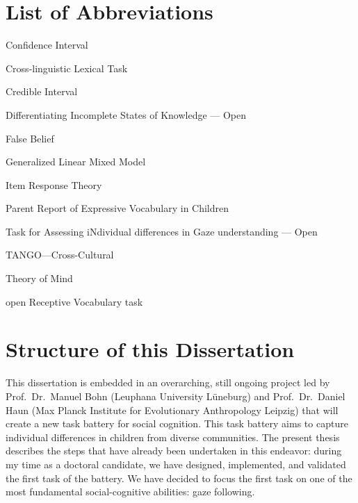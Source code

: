 \documentclass[
]{scrbook}
\providecommand{\tightlist}{%
  \setlength{\itemsep}{0pt}\setlength{\parskip}{0pt}}
\begin{document}
\chapter{List of Abbreviations}\label{acronyms_HEADER_LOA}

\begin{description}
\tightlist
\item[\phantomsection\label{acronyms_CI}{CI}]
Confidence Interval
\item[\phantomsection\label{acronyms_CLT}{CLT}]
Cross-linguistic Lexical Task
\item[\phantomsection\label{acronyms_CrI}{CrI}]
Credible Interval
\item[\phantomsection\label{acronyms_DISKO}{DISKO}]
Differentiating Incomplete States of Knowledge --- Open
\item[\phantomsection\label{acronyms_FB}{FB}]
False Belief
\item[\phantomsection\label{acronyms_GLMM}{GLMM}]
Generalized Linear Mixed Model
\item[\phantomsection\label{acronyms_IRT}{IRT}]
Item Response Theory
\item[\phantomsection\label{acronyms_PREVIC}{PREVIC}]
Parent Report of Expressive Vocabulary in Children
\item[\phantomsection\label{acronyms_TANGO}{TANGO}]
Task for Assessing iNdividual differences in Gaze understanding --- Open
\item[\phantomsection\label{acronyms_TANGOux2014CC}{TANGO---CC}]
TANGO---Cross-Cultural
\item[\phantomsection\label{acronyms_ToM}{ToM}]
Theory of Mind
\item[\phantomsection\label{acronyms_oREV}{oREV}]
open Receptive Vocabulary task
\end{description}

\chapter*{Structure of this Dissertation}\label{structure}

This dissertation is embedded in an overarching, still ongoing project led by Prof.~Dr.~Manuel Bohn (Leuphana University Lüneburg) and Prof.~Dr.~Daniel Haun (Max Planck Institute for Evolutionary Anthropology Leipzig) that will create a new task battery for social cognition. This task battery aims to capture individual differences in children from diverse communities. The present thesis describes the steps that have already been undertaken in this endeavor: during my time as a doctoral candidate, we have designed, implemented, and validated the first task of the battery. We have decided to focus the first task on one of the most fundamental social-cognitive abilities: gaze following.
\end{document}
